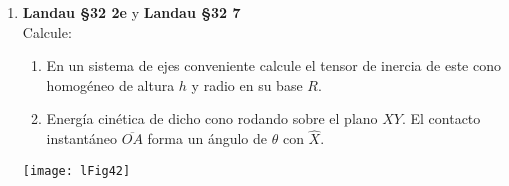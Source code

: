 \documentclass[11pt, spanish, a4paper, twoside]{article}
\begin{document}
\begin{enumerate}
\item 
\begin{minipage}[t][3.5cm]{0.5\textwidth}
\textbf{Landau \S 32 2e} y \textbf{Landau \S 32 7}\\
Calcule:
	\begin{enumerate}
		\item En un sistema de ejes conveniente calcule el tensor de inercia de este cono homogéneo de altura \(h\) y radio en su base \(R\).
		\item Energía cinética de dicho cono rodando sobre el plano \(X Y\).
		El contacto instantáneo \(\overline{O A}\) forma un ángulo de \(\theta\) con \(\hat{X}\).
	\end{enumerate}
\end{minipage}
\begin{minipage}[c][1cm][t]{0.45\textwidth}
	\texttt{[image: lFig42]}
\end{minipage}




\end{enumerate}
\end{document}
